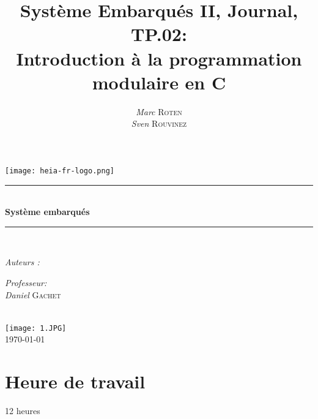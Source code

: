 

\title{Système Embarqués II, Journal, TP.02:\\ Introduction à la programmation modulaire en C} 
\author{\textsl{Marc} \textsc{Roten} \\ \textsl{Sven} \textsc{Rouvinez}}
\date{}


    \begin{titlepage}
        \begin{center}
            \texttt{[image: heia-fr-logo.png]}\\[1.3cm]
            
            \rule{\linewidth}{0.3mm} \\[0.3cm]
            {\huge \bfseries Système embarqués \\[0.5cm]} 
            \rule{\linewidth}{0.3mm} \\[0.8cm]
            \noindent
            \begin{minipage}[t]{0.4\textwidth}
                \begin{flushleft} \large
                    \emph{Auteurs :}\\
                    \theauthor
                \end{flushleft}
            \end{minipage}
            \begin{minipage}[t]{0.4\textwidth} 
                \begin{flushright} \large
                    \emph{Professeur:}\\
                    \textsl{Daniel} \textsc{Gachet}\\ 
                \end{flushright} 
                \vfill
            \end{minipage}\\[1.3cm]
            \texttt{[image: 1.JPG]}\\[1.5cm]
            \vspace*{1\baselineskip}
            \today \\[0.7cm]
        \end{center}
    \end{titlepage}
    \tableofcontents
    \clearpage
\section{Heure de travail}
12 heures

